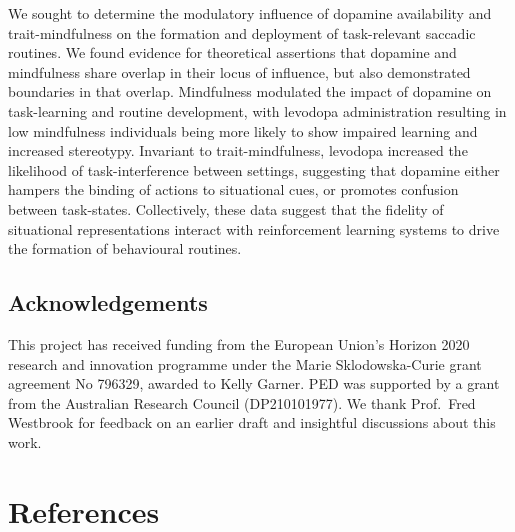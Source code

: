 \documentclass{article}
\begin{document}
We sought to determine the modulatory influence of dopamine availability
and trait-mindfulness on the formation and deployment of task-relevant
saccadic routines. We found evidence for theoretical assertions that
dopamine and mindfulness share overlap in their locus of influence, but
also demonstrated boundaries in that overlap. Mindfulness modulated the
impact of dopamine on task-learning and routine development, with
levodopa administration resulting in low mindfulness individuals being
more likely to show impaired learning and increased stereotypy.
Invariant to trait-mindfulness, levodopa increased the likelihood of
task-interference between settings, suggesting that dopamine either
hampers the binding of actions to situational cues, or promotes
confusion between task-states. Collectively, these data suggest that the
fidelity of situational representations interact with reinforcement
learning systems to drive the formation of behavioural routines.

\hypertarget{acknowledgements}{%
\subsection{Acknowledgements}\label{acknowledgements}}

This project has received funding from the European Union's Horizon 2020
research and innovation programme under the Marie Sklodowska-Curie grant
agreement No 796329, awarded to Kelly Garner. PED was supported by a
grant from the Australian Research Council (DP210101977). We thank
Prof.~Fred Westbrook for feedback on an earlier draft and insightful
discussions about this work.

\hypertarget{references}{%
\section*{References}\label{references}}
\end{document}
